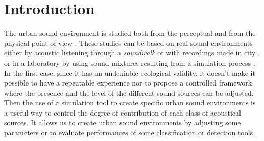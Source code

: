 \documentclass[11pt,letter]{article}
\begin{document}
%
%
%

\section{Introduction}

The urban sound environment is studied both from the perceptual \cite{jin_yong_soundwalk_2013} \cite{botteldooren_understanding_2011} and from the physical point of view \cite{can_describing_2015} \cite{raimbault_ambient_2003}. These studies can be based on real sound environments either by acoustic listening through a \textit{soundwalk} \cite{adams_soundwalking_2008} or with recordings made in city \cite{botteldooren_temporal_2006}, or in a laboratory by using sound mixtures resulting from a simulation process \cite{lafay_new_2014}. In the first case, since it has an undeniable ecological validity, it doesn't make it possible to have a repeatable experience nor to propose a controlled framework where the presence and the level of the different sound sources can be adjusted. Then the use of a simulation tool to create specific urban sound environments is a useful way to control the degree of contribution of each class of acoustical sources. It allows us to create urban sound environments by adjusting some parameters \cite{bruce_development_2009} or to evaluate performances of some classification or detection tools \cite{giannoulis_detection_2013}.
\end{document}
